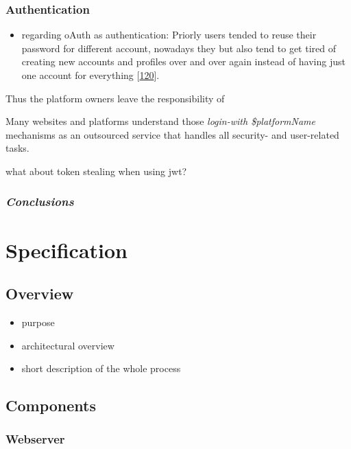 \documentclass[12pt,english,a4paper,titlepage,cleardoublepage=empty,dottedtoc]{report}
\providecommand{\tightlist}{%
  \setlength{\itemsep}{0pt}\setlength{\parskip}{0pt}}
\begin{document}
\subsection{Authentication}\label{authentication-1}

\begin{itemize}
\tightlist
\item
  regarding oAuth as authentication: Priorly users tended to reuse their
  password for different account, nowadays they but also tend to get
  tired of creating new accounts and profiles over and over again
  instead of having just one account for everything
  {[}\protect\hyperlink{ref-web_2009-success-of-facebook-connect}{120}{]}.
\end{itemize}

Thus the platform owners leave the responsibility of

Many websites and platforms understand those \emph{login-with
\$platformName} mechanisms as an outsourced service that handles all
security- and user-related tasks.

what about token stealing when using jwt?

\subsection{\texorpdfstring{\emph{Conclusions}}{Conclusions}}\label{conclusions-1}

\chapter{Specification}\label{specification}

\section{Overview}\label{overview}

\begin{itemize}
\tightlist
\item
  purpose
\item
  architectural overview
\item
  short description of the whole process
\end{itemize}

\section{Components}\label{components}

\subsection{Webserver}\label{webserver}
\end{document}

